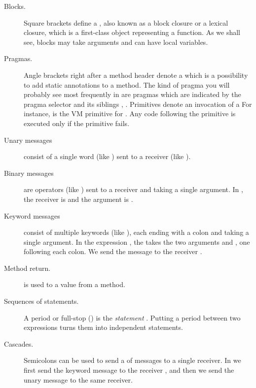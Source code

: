\documentclass[a4paper,10pt,twoside]{book}
\begin{document}
\begin{description}
\item[Blocks.]
	Square brackets \ct{[ ]} define a , also known as a block closure or a lexical closure, which is a first-class object representing a function.
	As we shall see, blocks may take arguments and can have local variables.

\item[Pragmas.]
	Angle brackets \ct{< >} right after a method header denote a  which is a possibility to add static annotations to a method.
	The kind of pragma you will probably see most frequently in \sq are \emph{} pragmas which are indicated by the pragma selector  and its siblings ,  \etc.
	Primitives denote an invocation of a  
	For instance,  is the VM primitive for .
	Any code following the primitive is executed only if the primitive fails.

\item[Unary messages] consist of a single word (like ) sent to a receiver (like ).

\item[Binary messages] are operators (like \ct{+}) sent to a receiver and taking a single argument.
	In , the receiver is  and the argument is .

\item[Keyword messages] consist of multiple keywords (like ), each ending with a colon and taking a single argument. 
	In the expression , the   takes the two arguments  and , one following each colon.
	We send the message to the receiver .

\item[Method return.]
	\ct{^} is used to  a value from a method. 

\item[Sequences of statements.]
	A period or full-stop () is the \emph{statement} .
	Putting a period between two expressions turns them into independent statements.	

\item[Cascades.]
	Semicolons can be used to send a  of messages to a single receiver.
	In  we first send the keyword message  to the receiver , and then we send the unary message  to the same receiver.

\end{description}
\end{document}

